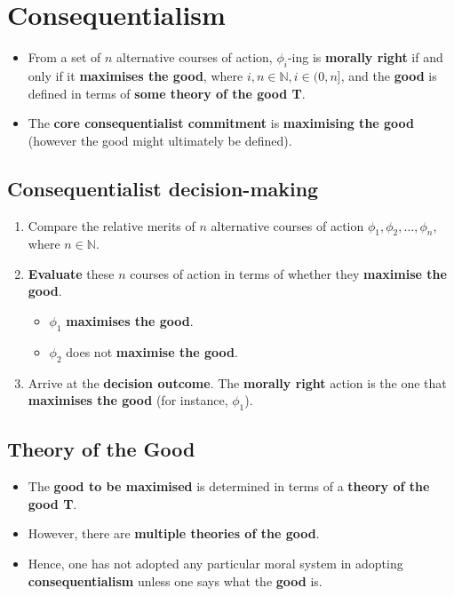 \documentclass[11pt]{article}
\begin{document}
 \newpage
\section{Consequentialism}
\label{sec:org6b9fc17}
\begin{itemize}
\item From a set of \(n\) alternative courses of action, \(\phi_i\)-ing is \textbf{morally right} if and only if it \textbf{maximises the good}, where \(i, n \in \mathbb{N}, i \in (0, n]\), and the \textbf{good} is defined in terms of \textbf{some theory of the good T}.
\item The \textbf{core consequentialist commitment} is \textbf{maximising the good} (however the good might ultimately be defined).
\end{itemize}
\subsection{Consequentialist decision-making}
\label{sec:org3263262}
\begin{enumerate}
\item Compare the relative merits of \(n\) alternative courses of action \(\phi_1, \phi_2, \ldots, \phi_n\), where \(n \in \mathbb{N}\).
\item \textbf{Evaluate} these \(n\) courses of action in terms of whether they \textbf{maximise the good}.
\begin{itemize}
\item \(\phi_1\) \textbf{maximises the good}.
\item \(\phi_2\) does not \textbf{maximise the good}.
\end{itemize}
\item Arrive at the \textbf{decision outcome}. The \textbf{morally right} action is the one that \textbf{maximises the good} (for instance, \(\phi_1\)).
\end{enumerate}

 \newpage
\subsection{Theory of the Good}
\label{sec:orgb38bda8}
\begin{itemize}
\item The \textbf{good to be maximised} is determined in terms of a \textbf{theory of the good T}.
\item However, there are \textbf{multiple theories of the good}.
\item Hence, one has not adopted any particular moral system in adopting \textbf{consequentialism} unless one says what the \textbf{good} is.
\end{itemize}
\end{document}
